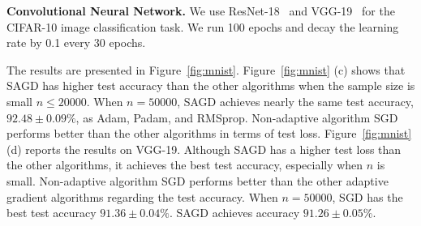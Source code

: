 \documentclass[11pt]{article}
\begin{document}
\textbf{Convolutional Neural Network.}
We use ResNet-18~\citep{hezh2016} and VGG-19~\citep{sizi2014} for the CIFAR-10 image classification task. We run 100 epochs and decay the learning rate by 0.1 every 30 epochs. 

The results are presented in Figure~\ref{fig:mnist}. 
Figure~\ref{fig:mnist} (c) shows that \textsc{SAGD} has higher test accuracy than the 
other algorithms when the sample size is small \ie $n \leq 20000$.
When $n = 50000$, \textsc{SAGD} achieves nearly the same test accuracy, $92.48 \pm 0.09\%$,  as Adam, Padam, and RMSprop.
Non-adaptive algorithm 
SGD performs better than the other algorithms in terms of test loss. 
Figure~\ref{fig:mnist} (d) reports the results on VGG-19. Although \textsc{SAGD} has a higher test loss than the other algorithms, it achieves the best test accuracy, especially when $n$ is small. Non-adaptive algorithm SGD performs better than the other adaptive gradient algorithms regarding the test accuracy.
When $n= 50000$, SGD has the best test accuracy $91.36 \pm 0.04\%$. \textsc{SAGD} achieves accuracy $91.26 \pm 0.05\%$.
\end{document}
